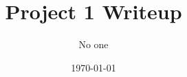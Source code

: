 %
%
%
% 
%
%
%
%
%
%
% 
%
%
% 

\documentclass[11pt]{article}

\usepackage[english]{babel}
\usepackage[utf8]{inputenc}
\usepackage[colorlinks = true,
            linkcolor = blue,
            urlcolor  = blue]{hyperref}
\usepackage[a4paper,margin=1.5in]{geometry}
\usepackage{stackengine,graphicx}
\usepackage{fancyhdr}
\setlength{\headheight}{15pt}
\usepackage{microtype}
\usepackage{times}
\usepackage{booktabs}

\usepackage[numbered,framed]{matlab-prettifier}

\frenchspacing
\setlength{\parindent}{0cm} %
\setlength{\parskip}{0.3cm plus1mm minus1mm}

\pagestyle{fancy}
\fancyhf{}
\rfoot{\thepage}

\title{\vspace{-1cm}Project 1 Writeup}
\author{No one}
\date{\today}



\maketitle
\vspace{-1.5cm}
\thispagestyle{fancy}

